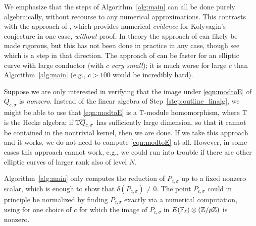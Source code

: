 \documentclass{article} \usepackage[active]{srcltx}
\begin{document}
\begin{remark}
  We emphasize that the steps of Algorithm~\ref{alg:main} can all be
  done purely algebraically, without recourse to any numerical
  approximations.  This contrasts with the approach of
  \cite{jetchev-lauter-stein}, which provides numerical {\em evidence}
  for Kolyvagin's conjecture in one case, {\em without} proof.  In
  theory the approach of \cite{jetchev-lauter-stein} can likely be
  made rigorous, but this has not been done in practice in any case,
  though see \cite{bradshaw:phd} which is a step in that direction.
  The approach of \cite{jetchev-lauter-stein} can be faster for an
  elliptic curve with large conductor (with $c$ {\em very small}); it
  is much worse for large $c$ than Algorithm~\ref{alg:main} (e.g.,
  $c>100$ would be incredibly hard).
\end{remark}

\begin{remark}\label{remark:spanQ}
  Suppose we are only interested in verifying that the image under
  \eqref{eqn:modtoE} of $\overline{Q}_{c,\sigma}$ is {\em
    nonzero}. Instead of the linear algebra of
  Step~\ref{step:outline_linalg}, we might be able to use that
  \eqref{eqn:modtoE} is a $\mathbb{T}$-module homomorphism, where $\mathbb{T}$ is the
  Hecke algebra; if $\mathbb{T}\overline{Q}_{c,\sigma}$ has sufficiently large
  dimension, so that it cannot be contained in the nontrivial kernel,
  then we are done.  If we take this approach and it works, we do not
  need to compute \eqref{eqn:modtoE} at all.  However, in some cases
  this approach cannot work, e.g., we could run into trouble if there
  are other elliptic curves of larger rank also of level $N$.
\end{remark}

\begin{remark}
  Algorithm~\ref{alg:main} only computes the reduction of
  $P_{c,\sigma}$ up to a fixed nonzero scalar, which is enough to show
  that $\delta(P_{c,\sigma})\neq 0$.  The point $P_{c,\sigma}$ could
  in principle be normalized by finding $P_{c,\sigma}$ exactly via a
  numerical computation, using \cite{jetchev-lauter-stein} for one
  choice of $c$ for which the image of $P_{c,\sigma}$ in
  $E(\mathbb{F}_{\ell})\otimes (\mathbb{Z}/p\mathbb{Z})$ is nonzero.
\end{remark}

\end{document}
